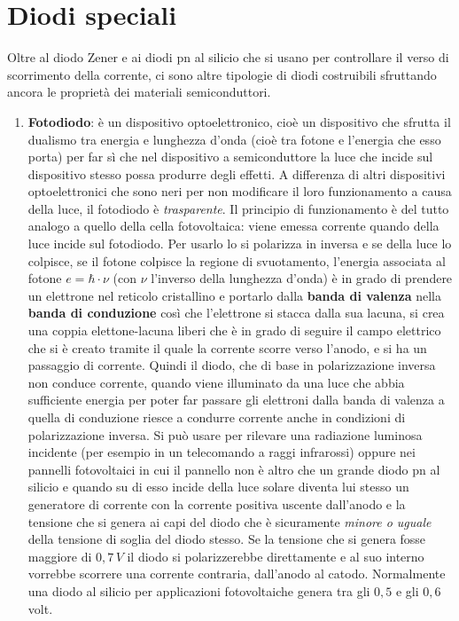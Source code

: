 \documentclass[12pt, a4paper]{report}
\begin{document}
\section{Diodi speciali}
Oltre al diodo Zener e ai diodi pn al silicio che si usano per controllare il verso di scorrimento della corrente, ci sono altre tipologie di diodi costruibili sfruttando ancora le proprietà dei materiali semiconduttori.
\begin{enumerate}
    \item \textbf{Fotodiodo}: è un dispositivo optoelettronico, cioè un dispositivo che sfrutta il dualismo tra energia e lunghezza d'onda (cioè tra fotone e l'energia che esso porta) per far sì che nel dispositivo a semiconduttore la luce che incide sul dispositivo stesso possa produrre degli effetti. A differenza di altri dispositivi optoelettronici che sono neri per non modificare il loro funzionamento a causa della luce, il fotodiodo è \textit{trasparente}. Il principio di funzionamento è del tutto analogo a quello della cella fotovoltaica: viene emessa corrente quando della luce incide sul fotodiodo. Per usarlo lo si polarizza in inversa e se della luce lo colpisce, se il fotone colpisce la regione di svuotamento, l'energia associata al fotone $e = \hbar \cdot \nu$ (con $\nu$ l'inverso della lunghezza d'onda) è in grado di prendere un elettrone nel reticolo cristallino e portarlo dalla \textbf{banda di valenza} nella \textbf{banda di conduzione} così che l'elettrone si stacca dalla sua lacuna, si crea una coppia elettone-lacuna liberi che è in grado di seguire il campo elettrico che si è creato tramite il quale la corrente scorre verso l'anodo, e si ha un passaggio di corrente. Quindi il diodo, che di base in polarizzazione inversa non conduce corrente, quando viene illuminato da una luce che abbia sufficiente energia per poter far passare gli elettroni dalla banda di valenza a quella di conduzione riesce a condurre corrente anche in condizioni di polarizzazione inversa. Si può usare per rilevare una radiazione luminosa incidente (per esempio in un telecomando a raggi infrarossi) oppure nei pannelli fotovoltaici in cui il pannello non è altro che un grande diodo pn al silicio e quando su di esso incide della luce solare diventa lui stesso un generatore di corrente con la corrente positiva uscente dall'anodo e la tensione che si genera ai capi del diodo che è sicuramente \textit{minore o uguale} della tensione di soglia del diodo stesso. Se la tensione che si genera fosse maggiore di $0,7\,V$ il diodo si polarizzerebbe direttamente e al suo interno vorrebbe scorrere una corrente contraria, dall'anodo al catodo. Normalmente una diodo al silicio per applicazioni fotovoltaiche genera tra gli $0,5$ e gli $0,6$ volt.

\end{enumerate}
\end{document}
